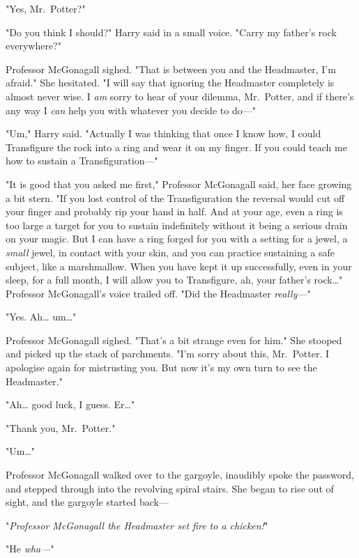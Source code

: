 "Yes, Mr.~Potter?"

"Do you think I should?" Harry said in a small voice. "Carry my father's rock
everywhere?"

Professor McGonagall sighed. "That is between you and the Headmaster, I'm
afraid." She hesitated. "I will say that ignoring the Headmaster completely is
almost never wise. I \emph{am} sorry to hear of your dilemma, Mr.~Potter, and
if there's any way I \emph{can} help you with whatever you decide to do---"

"Um," Harry said. "Actually I was thinking that once I know how, I could
Transfigure the rock into a ring and wear it on my finger. If you could teach
me how to sustain a Transfiguration---"

"It is good that you asked me first," Professor McGonagall said, her face
growing a bit stern. "If you lost control of the Transfiguration the reversal
would cut off your finger and probably rip your hand in half. And at your age,
even a ring is too large a target for you to sustain indefinitely without it
being a serious drain on your magic. But I can have a ring forged for you with
a setting for a jewel, a \emph{small} jewel, in contact with your skin, and you
can practice sustaining a safe subject, like a marshmallow. When you have kept
it up successfully, even in your sleep, for a full month, I will allow you to
Transfigure, ah, your father's rock{\ldots}" Professor McGonagall's voice
trailed off. "Did the Headmaster \emph{really---}"

"Yes. Ah{\ldots} um{\ldots}"

Professor McGonagall sighed. "That's a bit strange even for him." She stooped
and picked up the stack of parchments. "I'm sorry about this, Mr.~Potter. I
apologise again for mistrusting you. But now it's my own turn to see the
Headmaster."

"Ah{\ldots} good luck, I guess. Er{\ldots}"

"Thank you, Mr.~Potter."

"Um{\ldots}"

Professor McGonagall walked over to the gargoyle, inaudibly spoke the password,
and stepped through into the revolving spiral stairs. She began to rise out of
sight, and the gargoyle started back---

"\emph{Professor McGonagall the Headmaster set fire to a chicken!}"

"He \emph{wha---}"
